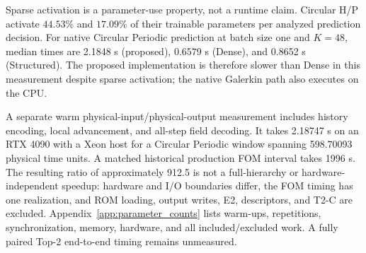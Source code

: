 Sparse activation is a parameter-use property, not a runtime claim.
Circular H/P activate $44.53\%$ and $17.09\%$ of their trainable
parameters per analyzed prediction decision.
For native Circular Periodic prediction at batch size one and
$K=48$, median times are 2.1848 s (proposed), 0.6579 s (Dense),
and 0.8652 s (Structured).
The proposed implementation is therefore slower than Dense in this
measurement despite sparse activation; the native Galerkin path
also executes on the CPU.

A separate warm physical-input/physical-output measurement includes
history encoding, local advancement, and all-step field decoding.
It takes 2.18747 s on an RTX 4090 with a Xeon host for a Circular
Periodic window spanning 598.70093 physical time units.
A matched historical production FOM interval takes 1996 s.
The resulting ratio of approximately 912.5 is not a full-hierarchy
or hardware-independent speedup: hardware and I/O boundaries differ,
the FOM timing has one realization, and ROM loading, output writes,
E2, descriptors, and T2-C are excluded.
Appendix~\ref{app:parameter_counts} lists warm-ups, repetitions,
synchronization, memory, hardware, and all included/excluded work.
A fully paired Top-2 end-to-end timing remains unmeasured.
